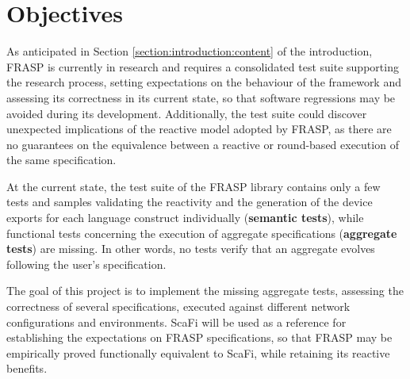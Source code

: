 
\section{Objectives}
\label{section:analysis:objectives}

As anticipated in Section \ref{section:introduction:content} of the
introduction, FRASP is currently in research and requires a consolidated test
suite supporting the research process, setting expectations on the behaviour of
the framework and assessing its correctness in its current state, so that
software regressions may be avoided during its development. Additionally, the
test suite could discover unexpected implications of the reactive model adopted
by FRASP, as there are no guarantees on the equivalence between a reactive or
round-based execution of the same specification.

At the current state, the test suite of the FRASP library contains only a few
tests and samples validating the reactivity and the generation of the device
exports for each language construct individually (\textbf{semantic tests}),
while functional tests concerning the execution of aggregate specifications
(\textbf{aggregate tests}) are missing. In other words, no tests verify that an
aggregate evolves following the user's specification.

The goal of this project is to implement the missing aggregate tests, assessing
the correctness of several specifications, executed against different network
configurations and environments. \ac{ScaFi} will be used as a reference for
establishing the expectations on FRASP specifications, so that FRASP may be
empirically proved functionally equivalent to \ac{ScaFi}, while retaining its
reactive benefits.
